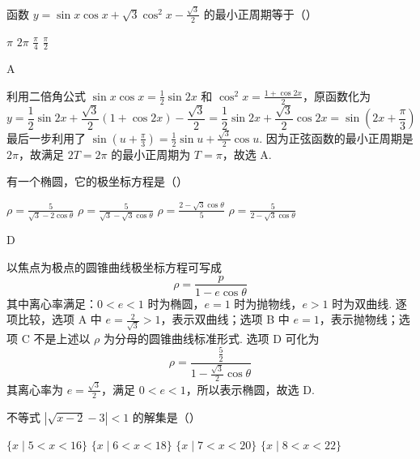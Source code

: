 \documentclass[UTF8,a4paper,oneside,11pt]{ctexbook}
\begin{document}
\begin{problem}
函数 \(y=\sin x\cos x+\sqrt{3}\cos^2 x-\frac{\sqrt{3}}{2}\) 的最小正周期等于（\quad）

\choices
    {\(\pi\)}
    {\(2\pi\)}
    {\(\frac{\pi}{4}\)}
    {\(\frac{\pi}{2}\)}
\end{problem}

\begin{answer}
A
\end{answer}

\begin{solution}
利用二倍角公式 \(\sin x\cos x=\frac12\sin 2x\) 和 \(\cos^2x=\frac{1+\cos 2x}{2}\)，原函数化为
\[
y=\frac12\sin2x+\frac{\sqrt{3}}{2}(1+\cos2x)-\frac{\sqrt{3}}2
=\frac12\sin2x+\frac{\sqrt{3}}2\cos2x
=\sin\left(2x+\frac{\pi}{3}\right)
\]
最后一步利用了 \(\sin(u+\frac\pi3)=\frac12\sin u+\frac{\sqrt3}{2}\cos u\). 因为正弦函数的最小正周期是 \(2\pi\)，故满足 \(2T=2\pi\) 的最小正周期为 \(T=\pi\)，故选 A.
\end{solution}

\begin{problem}
有一个椭圆，它的极坐标方程是（\quad）

\choices
    {\(\rho=\frac{5}{\sqrt{3}-2\cos\theta}\)}
    {\(\rho=\frac{5}{\sqrt{3}-\sqrt{3}\cos\theta}\)}
    {\(\rho=\frac{2-\sqrt{3}\cos\theta}{5}\)}
    {\(\rho=\frac{5}{2-\sqrt{3}\cos\theta}\)}
\end{problem}

\begin{answer}
D
\end{answer}

\begin{solution}
以焦点为极点的圆锥曲线极坐标方程可写成
\[
\rho=\frac{p}{1-e\cos\theta}
\]
其中离心率满足：\(0<e<1\) 时为椭圆，\(e=1\) 时为抛物线，\(e>1\) 时为双曲线. 逐项比较，选项 A 中 \(e=\frac{2}{\sqrt3}>1\)，表示双曲线；选项 B 中 \(e=1\)，表示抛物线；选项 C 不是上述以 \(\rho\) 为分母的圆锥曲线标准形式. 选项 D 可化为
\[
\rho=\frac{\frac{5}{2}}{1-\frac{\sqrt{3}}2\cos\theta}
\]
其离心率为 \(e=\frac{\sqrt3}{2}\)，满足 \(0<e<1\)，所以表示椭圆，故选 D.
\end{solution}

\begin{problem}
不等式 \(\left| \sqrt{x-2}-3 \right|<1\) 的解集是（\quad）

\choices
    {\(\{x\mid 5<x<16\}\)}
    {\(\{x\mid 6<x<18\}\)}
    {\(\{x\mid 7<x<20\}\)}
    {\(\{x\mid 8<x<22\}\)}
\end{problem}
\end{document}
